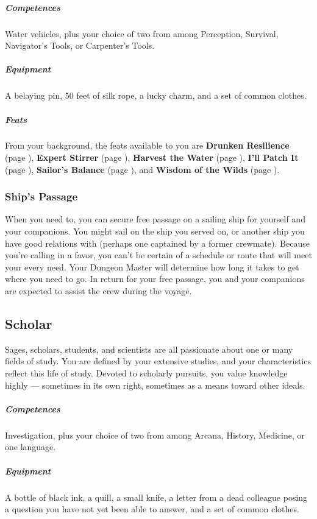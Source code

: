     \subparagraph{Competences} Water vehicles, plus your choice of two from among Perception, Survival, Navigator's Tools, or Carpenter's Tools.

    \subparagraph{Equipment} A belaying pin, 50 feet of silk rope, a lucky charm, and a set of common clothes.

    \subparagraph{Feats} From your background, the feats available to you are
    \textbf{Drunken Resilience} (page \pageref{feat::drunkenresilience}),
    \textbf{Expert Stirrer} (page \pageref{feat::expertstirrer}),
    \textbf{Harvest the Water} (page \pageref{feat::harvestthewater}),
    \textbf{I'll Patch It} (page \pageref{feat::illpatchit}),
    \textbf{Sailor's Balance} (page \pageref{feat::sailorsbalance}), and
    \textbf{Wisdom of the Wilds} (page \pageref{feat::wisdomofthewilds}).

    \subsubsection{Ship's Passage}
        When you need to, you can secure free passage on a sailing ship for yourself and your companions.
        You might sail on the ship you served on, or another ship you have good relations with (perhaps one captained by a former crewmate).
        Because you're calling in a favor, you can't be certain of a schedule or route that will meet your every need.
        Your Dungeon Master will determine how long it takes to get where you need to go.
        In return for your free passage, you and your companions are expected to assist the crew during the voyage.

\subsection*{Scholar} \label{ssec::scholar}
    Sages, scholars, students, and scientists are all passionate about one or many fields of study.
    You are defined by your extensive studies, and your characteristics reflect this life of study.
    Devoted to scholarly pursuits, you value knowledge highly --- sometimes in its own right, sometimes as a means toward other ideals.

    \subparagraph{Competences} Investigation, plus your choice of two from among Arcana, History, Medicine, or one language.

    \subparagraph{Equipment} A bottle of black ink, a quill, a small knife, a letter from a dead colleague posing a question you have not yet been able to answer, and a set of common clothes.

